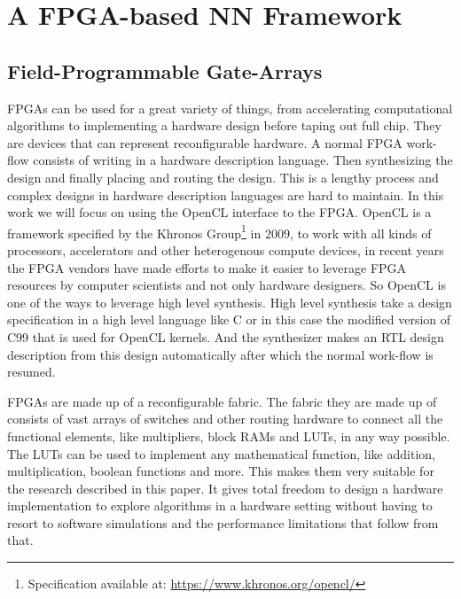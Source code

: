\documentclass[techrep,english]{ipsj} %
\begin{document}
\section{A FPGA-based NN Framework}\label{sec:framework}
\subsection{Field-Programmable Gate-Arrays}

FPGAs can be used for a great variety of things, from accelerating computational algorithms to implementing a hardware design before taping out full chip.
They are devices that can represent reconfigurable hardware.
A normal FPGA work-flow consists of writing in a hardware description language.
Then synthesizing the design and finally placing and routing the design.
This is a lengthy process and complex designs in hardware description languages are hard to maintain.
In this work we will focus on using the OpenCL interface to the FPGA.
OpenCL is a framework specified by the Khronos Group\footnote{Specification available at: \url{https://www.khronos.org/opencl/}} in 2009, to work with all kinds of processors, accelerators and other heterogenous compute devices, in recent years the FPGA vendors have made efforts to make it easier to leverage FPGA resources by computer scientists and not only hardware designers.
So OpenCL is one of the ways to leverage high level synthesis.
High level synthesis take a design specification in a high level language like C or in this case the modified version of C99 that is used for OpenCL kernels.
And the synthesizer makes an RTL design description from this design automatically after which the normal work-flow is resumed.

FPGAs are made up of a reconfigurable fabric.
The fabric they are made up of consists of vast arrays of switches and other routing hardware to connect all the functional elements, like multipliers, block RAMs and LUTs, in any way possible.
The LUTs can be used to implement any mathematical function, like addition, multiplication, boolean functions and more.
This makes them very suitable for the research described in this paper.
It gives total freedom to design a hardware implementation to explore algorithms in a hardware setting without having to resort to software simulations and the performance limitations that follow from that.
\end{document}
